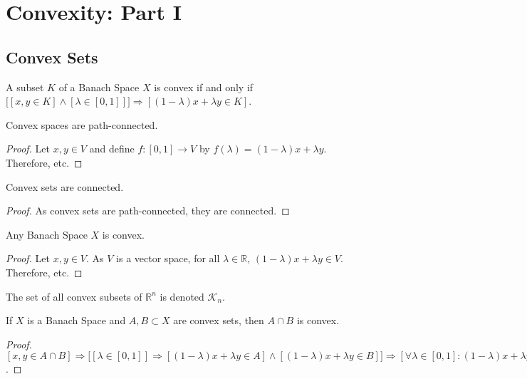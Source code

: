 \documentclass[crop=false,class=article,oneside]{standalone}
\begin{document}
    \ifx\ifsub\undefined
        \section*{Convexity: Part I}
        \setcounter{section}{1}
    \fi
    \subsection{Convex Sets}
        \begin{definition}
        A subset $K$ of a Banach Space $X$ is convex if and only if $\big[[x,y\in K]\land  [\lambda \in [0,1]]\big]\Rightarrow[(1-\lambda)x+\lambda y\in K]$.
        \end{definition}
        \begin{theorem}
        Convex spaces are path-connected.
        \end{theorem}
        \begin{proof}
        Let $x,y\in V$ and define $f:[0,1]\rightarrow V$ by $f(\lambda) = (1-\lambda)x+\lambda y$. Therefore, etc.
        \end{proof}
        \begin{corollary}
        Convex sets are connected.
        \end{corollary}
        \begin{proof}
        As convex sets are path-connected, they are connected.
        \end{proof}
        \begin{theorem}
        Any Banach Space $X$ is convex.
        \end{theorem}
        \begin{proof}
        Let $x,y\in V$. As $V$ is a vector space, for all $\lambda \in \mathbb{R}$, $(1-\lambda)x+\lambda y\in V$. Therefore, etc.
        \end{proof}
        \begin{notation}
        The set of all convex subsets of $\mathbb{R}^n$ is denoted $\mathscr{K}_n$.
        \end{notation}
        \begin{theorem}
        If $X$ is a Banach Space and $A,B\subset X$ are convex sets, then $A\cap B$ is convex.
        \end{theorem}
        \begin{proof}
        $[x,y \in A\cap B] \Rightarrow \big[[\lambda \in [0,1]]\Rightarrow[ (1-\lambda)x+\lambda y \in A]\land [ (1-\lambda)x+\lambda y \in B]\big] \Rightarrow [\forall \lambda \in [0,1]:(1-\lambda)x+\lambda y \in A\cap B]$. 
        \end{proof}
\end{document}
